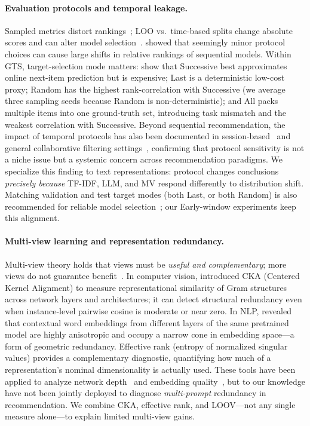 \documentclass[sigconf,natbib=true,anonymous]{acmart}
\newcommand{\tfidf}{\textsc{TF-IDF}\xspace}
\newcommand{\llm}{\textsc{LLM}\xspace}
\newcommand{\mv}{\textsc{MV}\xspace}
\begin{document}
\paragraph{Evaluation protocols and temporal leakage.}
Sampled metrics distort rankings~\cite{krichene2020sampledmetrics}; LOO vs.\ time-based splits change absolute scores and can alter model selection~\cite{ji2023evaluation,sun2023reevaluation,meng2020temporal}.
\citet{hidasi2018recurrent} showed that seemingly minor protocol choices can cause large shifts in relative rankings of sequential models.
Within GTS, target-selection mode matters: \citet{gusak2025time} show that Successive best approximates online next-item prediction but is expensive; Last is a deterministic low-cost proxy; Random has the highest rank-correlation with Successive (we average three sampling seeds because Random is non-deterministic); and All packs multiple items into one ground-truth set, introducing task mismatch and the weakest correlation with Successive.
Beyond sequential recommendation, the impact of temporal protocols has also been documented in session-based~\cite{hidasi2018recurrent} and general collaborative filtering settings~\cite{meng2020temporal}, confirming that protocol sensitivity is not a niche issue but a systemic concern across recommendation paradigms.
We specialize this finding to text representations: protocol changes conclusions \emph{precisely because} \tfidf, \llm, and \mv respond differently to distribution shift.
Matching validation and test target modes (both Last, or both Random) is also recommended for reliable model selection~\cite{gusak2025time}; our Early-window experiments keep this alignment.

\paragraph{Multi-view learning and representation redundancy.}
Multi-view theory holds that views must be \emph{useful and complementary}; more views do not guarantee benefit~\cite{xu2013multiview}.
In computer vision, \citet{kornblith2019cka} introduced CKA (Centered Kernel Alignment) to measure representational similarity of Gram structures across network layers and architectures; it can detect structural redundancy even when instance-level pairwise cosine is moderate or near zero.
In NLP, \citet{ethayarajh2019contextual} revealed that contextual word embeddings from different layers of the same pretrained model are highly anisotropic and occupy a narrow cone in embedding space---a form of geometric redundancy.
Effective rank (entropy of normalized singular values) provides a complementary diagnostic, quantifying how much of a representation's nominal dimensionality is actually used.
These tools have been applied to analyze network depth~\cite{kornblith2019cka} and embedding quality~\cite{ethayarajh2019contextual}, but to our knowledge have not been jointly deployed to diagnose \emph{multi-prompt} redundancy in recommendation.
We combine CKA, effective rank, and LOOV---not any single measure alone---to explain limited multi-view gains.
\end{document}
